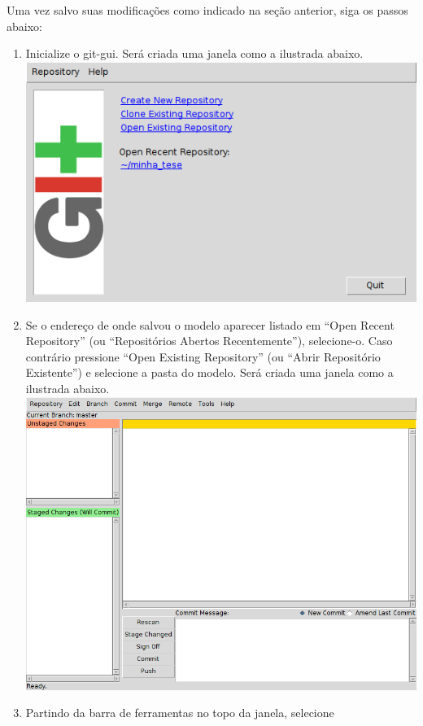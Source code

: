 Uma vez salvo suas modificações como indicado na seção anterior, siga os passos
abaixo:
\begin{enumerate}
  \item Inicialize o git-gui. Será criada uma janela como a ilustrada abaixo.\\
    \includegraphics[scale=.6]{figuras/git-gui00-1}
  \item Se o endereço de onde salvou o modelo aparecer listado em ``Open Recent
    Repository'' (ou ``Repositórios Abertos Recentemente''), selecione-o. Caso
    contrário pressione ``Open Existing Repository'' (ou ``Abrir Repositório
    Existente'') e selecione a pasta do modelo. Será criada uma janela como a
    ilustrada abaixo.\\
    \includegraphics[scale=.6]{figuras/git-gui04-1}
  \item Partindo da barra de ferramentas no topo da janela, selecione

\end{enumerate}
